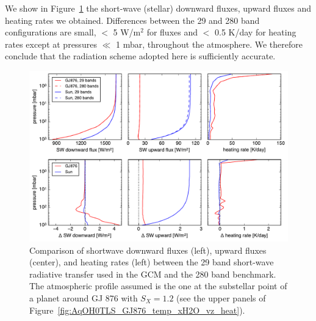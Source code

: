 \documentclass[11pt,numberedappendix,twocolappendix,]{emulateapj}
\begin{document}
We show in Figure~\ref{fig:socrates} the short-wave (stellar) downward fluxes, upward fluxes and heating rates we obtained.
Differences between the 29 and 280 band configurations are small, $<$ 5 W/m$^2$ for fluxes and $<$ 0.5 K/day for heating rates except at pressures $\ll$ 1 mbar, throughout the atmosphere. We therefore conclude that the radiation scheme adopted here is sufficiently accurate.

\begin{figure}[!htb]
    \begin{center}
    \includegraphics[width=0.8\hsize]{rad_comparison_SW29-SW280_AqOH0TLS_GJ876S12P20L40Q.pdf}
    \end{center}
\caption{Comparison of shortwave downward fluxes (left), upward fluxes (center), and heating rates (left) between the 29 band short-wave radiative transfer used in the GCM and the 280 band benchmark. The atmospheric profile assumed is the one at the substellar point of a planet around GJ 876 with $S_X=1.2$ (see the upper panels of Figure~\ref{fig:AqOH0TLS_GJ876_temp_xH2O_vz_heat}). }
\label{fig:socrates}
\end{figure}
\end{document}

